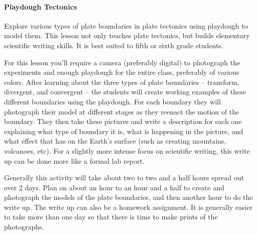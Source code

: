 \paragraph{Playdough Tectonics} Explore various types of plate boundaries in
plate tectonics using playdough to model them. This lesson not only teaches
plate tectonics, but builds elementary scientific writing skills. It is best
suited to fifth or sixth grade students.

For this lesson you'll require a camera (preferably digital) to photograph the
experiments and enough playdough for the entire class, preferably of various
colors. After learning about the three types of plate boundaries -- transform,
divergent, and convergent -- the students will create working examples of these
different boundaries using the playdough. For each boundary they will photograph
their model at different stages as they reenact the motion of the boundary. They
then take these pictures and write a description for each one explaining what
type of boundary it is, what is happening in the picture, and what effect
that has on the Earth's surface (such as creating mountains, volcanoes, etc).
For a slightly more intense focus on scientific writing, this write up can be
done more like a formal lab report.

Generally this activity will take about two to two and a half hours spread out
over 2 days. Plan on about an hour to an hour and a half to create and
photograph the models of the plate boundaries, and then another hour to do the
write up. The write up can also be a homework assignment. It is generally easier
to take more than one day so that there is time to make prints of the
photographs.

